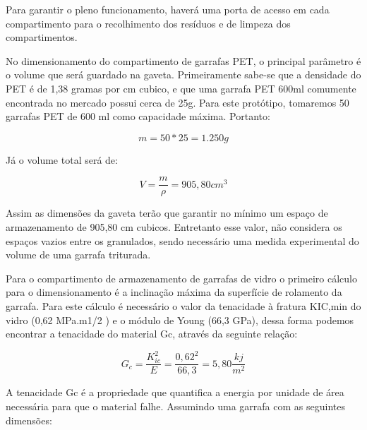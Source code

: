 Para garantir o pleno funcionamento, haverá uma porta de acesso em cada compartimento para o recolhimento dos resíduos e de limpeza dos compartimentos.

No dimensionamento do compartimento de garrafas PET, o principal parâmetro é o volume que será guardado na gaveta. Primeiramente sabe-se que a densidade do PET é de 1,38 gramas por cm cubico, e que uma garrafa PET 600ml comumente encontrada no mercado possui cerca de 25g. Para este protótipo, tomaremos 50 garrafas PET de 600 ml como capacidade máxima. Portanto:

\begin{equation}
    m = 50 \ast 25 = 1.250 g
\end{equation}

Já o volume total será de:

\begin{equation}
    V = \frac{m}{\rho} = 905,80 cm^{3}
\end{equation}

Assim as dimensões da gaveta terão que garantir no mínimo um espaço de armazenamento de 905,80 cm cubicos. Entretanto esse valor, não considera os espaços vazios entre os granulados, sendo necessário uma medida experimental do volume de uma garrafa triturada.

Para o compartimento de armazenamento de garrafas de vidro o primeiro cálculo para o dimensionamento é a inclinação máxima da superfície de rolamento da garrafa. Para este cálculo é necessário o valor da tenacidade à fratura KIC,min do vidro (0,62 MPa.m1/2 ) e o módulo de Young (66,3 GPa), dessa forma podemos encontrar a tenacidade do material Gc, através da seguinte relação:

\begin{equation}
    G_{c} = \frac{K_{ic}^{2}}{E} = \frac{0,62^{2}}{66,3} = 5,80 \frac{kj}{m^{2}}
\end{equation}

A tenacidade Gc é a propriedade que quantifica a energia por unidade de área necessária para que o material falhe. Assumindo uma garrafa com as seguintes dimensões:

\newpage

